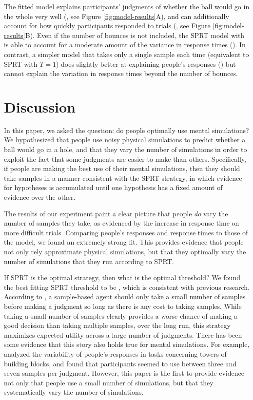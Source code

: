 \documentclass[10pt,letterpaper]{article}
\begin{document}
The fitted model explains participants' judgments of whether the ball would go in the whole very well (\HoleResponseCorr{}, see Figure \ref{fig:model-results}A), and can additionally account for how quickly participants responded to trials (\HoleRTCorr{}, see Figure \ref{fig:model-results}B).
Even if the number of bounces is not included, the SPRT model with \threshold{} is able to account for a moderate amount of the variance in response times (\NoBouncesHoleRTCorr{}).
In contrast, a simpler model that takes only a single sample each time (equivalent to SPRT with $T=1$) does slightly better at explaining people's responses (\RawHoleResponseCorr{}) but cannot explain the variation in response times beyond the number of bounces.

\section{Discussion}

In this paper, we asked the question: do people optimally use mental simulations?
We hypothesized that people use noisy physical simulations to predict whether a ball would go in a hole, and that they vary the number of simulations in order to exploit the fact that some judgments are easier to make than others.
Specifically, if people are making the best use of their mental simulations, then they should take samples in a manner consistent with the SPRT strategy, in which evidence for hypotheses is accumulated until one hypothesis has a fixed amount of evidence over the other.

The results of our experiment paint a clear picture that people \emph{do} vary the number of samples they take, as evidenced by the increase in response time on more difficult trials.
Comparing people's responses and response times to those of the model, we found an extremely strong fit.
This provides evidence that people not only rely approximate physical simulations, but that they optimally vary the number of simulations that they run according to SPRT.

If SPRT is the optimal strategy, then what is the optimal threshold?
We found the best fitting SPRT threshold to be \threshold{}, which is consistent with previous research.
According to , a sample-based agent should only take a small number of samples before making a judgment so long as there is any cost to taking samples.
While taking a small number of samples clearly provides a worse chance of making a good decision than taking multiple samples, over the long run, this strategy maximizes expected utility across a large number of judgments.
There has been some evidence that this story also holds true for mental simulations.
For example,  analyzed the variability of people's responses in tasks concerning towers of building blocks, and found that participants seemed to use between three and seven samples per judgment.
However, this paper is the first to provide evidence not only that people use a small number of simulations, but that they systematically vary the number of simulations.
\end{document}
